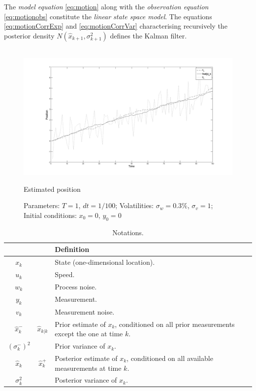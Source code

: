 \documentclass{article}
\theoremstyle{definition}
\theoremstyle{remark}
\begin{document}
The \textit{model equation} \eqref{eq:motion} along with the \textit{observation equation} \eqref{eq:motionobs} constitute the \textit{linear state space model}. The equations \eqref{eq:motionCorrExp} and \eqref{eq:motionCorrVar} characterising recursively the posterior density $N(\hat{x}_{k+1}, \sigma_{k+1}^2)$ defines the Kalman filter.
\\
\\
\begin{figure}[h!]
	\centering
	\includegraphics[width=1.1\textwidth]{example_TS.png}
	\caption{Estimated position}
	\caption*{Parameters: $T=1$, $dt=1/100$; Volatilities: $\sigma_w=0.3\%$, $\sigma_v=1$; Initial conditions: $x_0=0$, $y_0=0$}
\end{figure}

\begin{table}[h!]
  \begin{center}
    \begin{tabular}{ c  c  p{10cm} }
    \hline
		 & & Definition\\ \hline
		$x_k$ & & State (one-dimensional location).\\
		$u_k$ & & Speed.\\
		$w_k$ & & Process noise.\\
		$y_k$ & & Measurement.\\
		$v_k$ & & Measurement noise.\\
		$\hat{x}^-_k$ & $\hat{x}_{k|k}$ & Prior estimate of $x_k$, conditioned on all prior measurements except the one at time $k$.\\
		$(\sigma_{k}^-)^2$ & & Prior variance of $x_k$.\\
		$\hat{x}_k$ & $\hat{x}^+_k$ & Posterior estimate of $x_k$, conditioned on all available measurements at time $k$.\\
		$\sigma_{k}^2$ & & Posterior variance of $x_k$.\\
    \hline
    \end{tabular}
  \end{center}
  \caption{Notations.}
\end{table}
\end{document}
